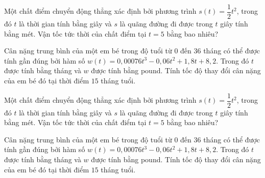 \begin{bt}%
	Một chất điểm chuyển động thẳng xác định bởi phương trình $s(t)=\dfrac{1}{2} t^2$, trong đó $t$ là thời gian tính  bằng giây và $s$ là quãng đường đi được trong $t$ giây tính bằng mét. Vận tốc tức thời của chất điểm tại $t=5$ bằng bao nhiêu?
\end{bt}

\begin{bt}%
	Cân nặng trung bình của một em bé trong độ tuổi từ $0$ đến $36$ tháng có thể được tính gần đúng bởi hàm số $w(t) = 0{,}00076t^3 - 0{,}06t^2 + 1{,}8t + 8{,}2$. Trong đó $t$ được tính bằng tháng và $w$ được tính bằng  pound. Tính tốc độ thay đổi cân nặng của em bé đó tại thời điểm $15$ tháng tuổi.
\end{bt}

\begin{ex}%
	Một chất điểm chuyển động thẳng xác định bởi phương trình $s(t)=\dfrac{1}{2} t^2$, trong đó $t$ là thời gian tính bằng giây và $s$  là quãng đường đi được trong $t$ giây tính bằng mét. Vận tốc tức thời của chất điểm tại $t=5$ bằng bao nhiêu?
\end{ex}

\begin{ex}%
	Cân nặng trung bình của một em bé trong độ tuổi từ $0$ đến $36$ tháng có thể được tính gần đúng bởi hàm số $w(t) = 0{,}00076t^3 - 0{,}06t^2 + 1{,}8t + 8{,}2$. Trong đó $t$ được tính bằng tháng và $w$ được tính bằng pound. Tính tốc  độ thay đổi cân nặng của em bé đó tại thời điểm $15$ tháng tuổi.
\end{ex}

